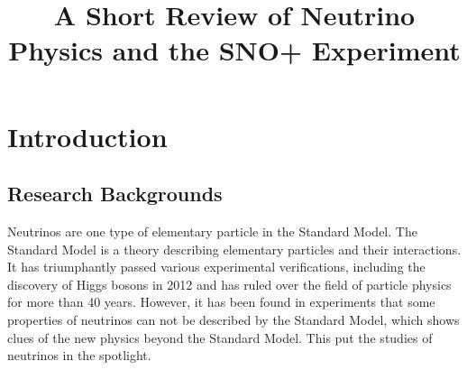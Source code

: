 \documentclass[preprint,12pt]{elsarticle}
\numberwithin{equation}{section}
\begin{document}
\begin{frontmatter}



\title{A Short Review of Neutrino Physics and the SNO+ Experiment}


\author{\quad}

\address{Department of Physics}

\end{frontmatter}


\section{Introduction}

\subsection{Research Backgrounds}
Neutrinos are one type of elementary particle in the Standard Model. The Standard Model is a theory describing elementary particles and their interactions. It has triumphantly passed various experimental verifications, including the discovery of Higgs bosons in 2012 and has ruled over the field of particle physics for more than 40 years. However, it has been found in experiments that some properties of neutrinos can not be described by the Standard Model, which shows clues of the new physics beyond the Standard Model. This put the studies of neutrinos in the spotlight.
\end{document}
